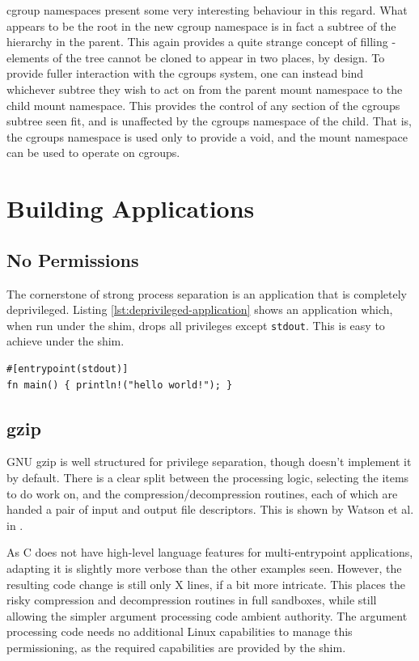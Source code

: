 \documentclass[a4paper,12pt,twoside,openright]{report}
\begin{document}
cgroup namespaces present some very interesting behaviour in this regard. What appears to be the root in the new cgroup namespace is in fact a subtree of the hierarchy in the parent. This again provides a quite strange concept of filling - elements of the tree cannot be cloned to appear in two places, by design. To provide fuller interaction with the cgroups system, one can instead bind whichever subtree they wish to act on from the parent mount namespace to the child mount namespace. This provides the control of any section of the cgroups subtree seen fit, and is unaffected by the cgroups namespace of the child. That is, the cgroups namespace is used only to provide a void, and the mount namespace can be used to operate on cgroups.


\chapter{Building Applications}
\label{chap:building-apps}

\section{No Permissions}

The cornerstone of strong process separation is an application that is completely deprivileged. Listing \ref{lst:deprivileged-application} shows an application which, when run under the shim, drops all privileges except \texttt{stdout}. This is easy to achieve under the shim.

\begin{lstlisting}[float,label={lst:deprivileged-application}]
#[entrypoint(stdout)]
fn main() { println!("hello world!"); }
\end{lstlisting}

\section{gzip}

GNU gzip \citep{gailly_gzip_2020} is well structured for privilege separation, though doesn't implement it by default. There is a clear split between the processing logic, selecting the items to do work on, and the compression/decompression routines, each of which are handed a pair of input and output file descriptors. This is shown by Watson et al. in \cite{watson_capsicum_2010}.

As C does not have high-level language features for multi-entrypoint applications, adapting it is slightly more verbose than the other examples seen. However, the resulting code change is still only X lines, if a bit more intricate. This places the risky compression and decompression routines in full sandboxes, while still allowing the simpler argument processing code ambient authority. The argument processing code needs no additional Linux capabilities to manage this permissioning, as the required capabilities are provided by the shim.
\end{document}
